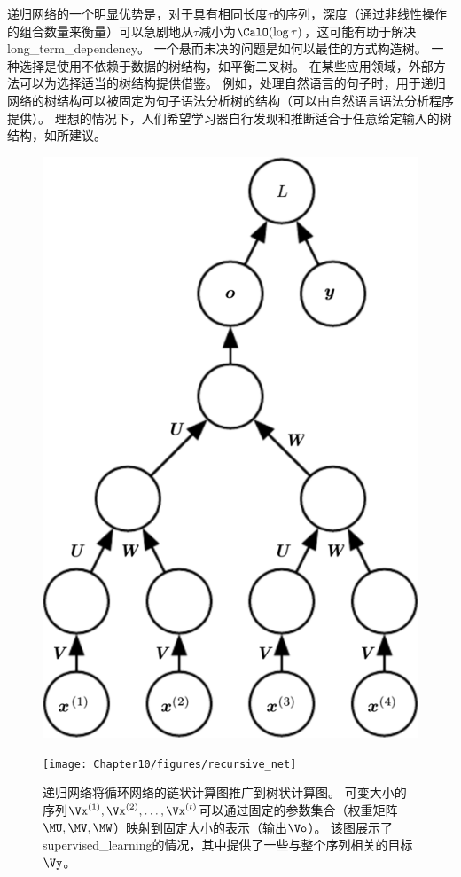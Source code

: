 
递归网络的一个明显优势是，对于具有相同长度$\tau$的序列，深度（通过非线性操作的组合数量来衡量）可以急剧地从$\tau$减小为$\CalO(\log \tau)$，这可能有助于解决\gls{long_term_dependency}。
一个悬而未决的问题是如何以最佳的方式构造树。
一种选择是使用不依赖于数据的树结构，如平衡二叉树。
在某些应用领域，外部方法可以为选择适当的树结构提供借鉴。
例如，处理自然语言的句子时，用于递归网络的树结构可以被固定为句子语法分析树的结构（可以由自然语言语法分析程序提供）\citep{Socher-et-al-2011a,Socher-et-al-2013a}。
理想的情况下，人们希望学习器自行发现和推断适合于任意给定输入的树结构，如\citep{Bottou-2011}所建议。


\begin{figure}[!htb]
\ifOpenSource
\centerline{\includegraphics[scale=0.5]{images/102.png}}
\else
\centerline{\texttt{[image: Chapter10/figures/recursive\_net]}}
\fi
\caption{递归网络将循环网络的链状计算图推广到树状计算图。
可变大小的序列$\Vx^{(1)},\Vx^{(2)},\dots,\Vx^{(t)}$可以通过固定的参数集合（权重矩阵$\MU,\MV,\MW$）映射到固定大小的表示（输出$\Vo$）。
该图展示了\gls{supervised_learning}的情况，其中提供了一些与整个序列相关的目标$\Vy$。
}
\label{fig:chap10_recursive_net}
\end{figure}

